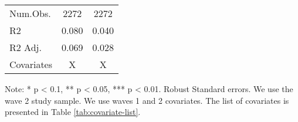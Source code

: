 \begin{table}
\begin{threeparttable}
\begin{tabular}[t]{lcc}
\midrule
Num.Obs. & \num{2272} & \num{2272}\\
R2 & \num{0.080} & \num{0.040}\\
R2 Adj. & \num{0.069} & \num{0.028}\\
Covariates & X & X\\
\bottomrule
\end{tabular}
\begin{tablenotes}
\item Note: * p < 0.1, ** p < 0.05, *** p < 0.01. Robust Standard errors. We use the wave 2 study sample. We use waves 1 and 2 covariates. The list of covariates is presented in Table \ref{tab:covariate-list}.
\end{tablenotes}
\end{threeparttable}
\end{table}
